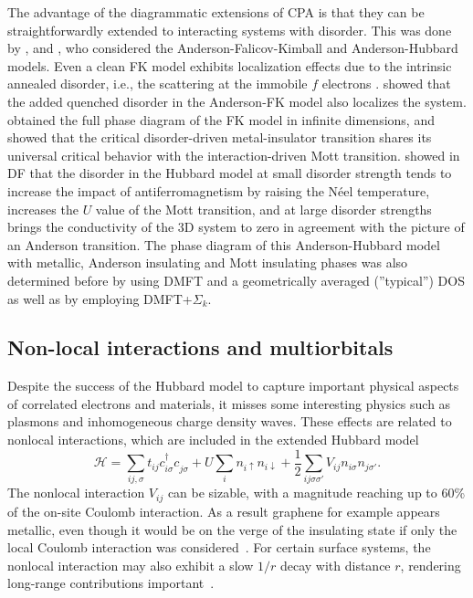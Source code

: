 \documentclass[rmp,aps,reprint,amsmath,amssymb,superscriptaddress,showpacs,nofootinbib]{revtex4-1}
\begin{document}
The advantage of the diagrammatic extensions of CPA is that they can be straightforwardly extended to interacting systems with disorder. This was done by ,  and , who considered the Anderson-Falicov-Kimball and Anderson-Hubbard models. Even a clean FK model exhibits localization effects due to the intrinsic annealed disorder, i.e., the scattering at the immobile $f$ electrons \cite{Antipov2016}.  showed that the added quenched disorder in the Anderson-FK model also localizes the system.  obtained the full phase diagram of the FK model in infinite dimensions, and showed that the critical disorder-driven metal-insulator transition shares its universal critical behavior with the interaction-driven Mott transition.  showed in DF that the disorder in the Hubbard model at small disorder strength tends to increase the impact of antiferromagnetism by raising the N\'eel temperature, increases the  $U$ value of the Mott transition, and at large disorder strengths brings the conductivity of the 3D system to zero in agreement with the picture of an Anderson transition. The phase diagram of this  Anderson-Hubbard model with metallic, Anderson insulating and Mott insulating phases was also determined before by  using DMFT and a geometrically averaged (”typical”) DOS as well as by   employing  DMFT+$\Sigma_k$.

\subsection{Non-local interactions and multiorbitals}
\label{sec:nonlocalv}

Despite the success of the Hubbard model to capture important physical aspects of correlated electrons and materials, it misses some interesting physics such as plasmons and inhomogeneous charge density waves.
These effects are related to nonlocal interactions, which are included in the extended Hubbard model  
\begin{equation}
\label{eq:ehm}
  \mathcal{H} = \sum_{ij,\sigma} t_{ij} c_{i\sigma}^{\dagger}c^{\phantom{\dagger}}_{j\sigma} + U\sum_{i}n_{i\uparrow}n_{i\downarrow} + \frac{1}{2}\sum_{ij\sigma\sigma'} V_{ij} n_{i\sigma}n_{j\sigma'}.
\end{equation}
The nonlocal interaction  $V_{ij}$ can be sizable, with a magnitude reaching up to 60\% of the on-site Coulomb interaction. As a result graphene for example appears metallic, even though it would be on the verge of the insulating state if only the local Coulomb interaction was considered~\cite{Wehling11}. For certain surface systems, the nonlocal interaction may also exhibit a slow $1/r$ decay with distance $r$, rendering long-range contributions important~\cite{Hansmann2013,Hansmann2016}.
\end{document}
